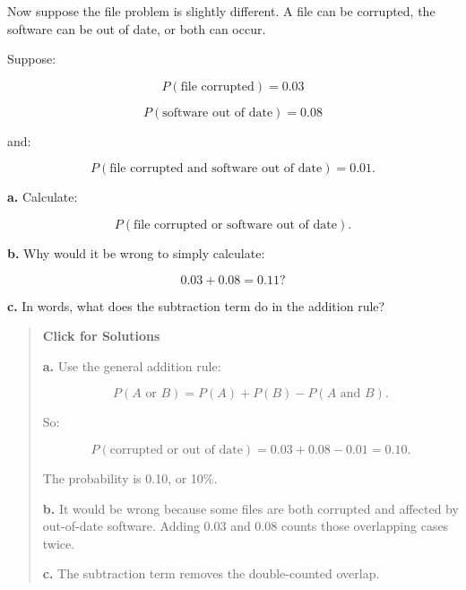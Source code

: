 \documentclass[
  letterpaper,
  DIV=11,
  numbers=noendperiod]{scrreprt}
\begin{document}
\begin{tcolorbox}[enhanced jigsaw, arc=.35mm, bottomrule=.15mm, bottomtitle=1mm, breakable, colback=white, colbacktitle=quarto-callout-note-color!10!white, colframe=quarto-callout-note-color-frame, coltitle=black, left=2mm, leftrule=.75mm, opacityback=0, opacitybacktitle=0.6, rightrule=.15mm, title=\textcolor{quarto-callout-note-color}{\faInfo}\hspace{0.5em}{Question 8}, titlerule=0mm, toprule=.15mm, toptitle=1mm]

Now suppose the file problem is slightly different. A file can be
corrupted, the software can be out of date, or both can occur.

Suppose:

\[P(\text{file corrupted}) = 0.03\]

\[P(\text{software out of date}) = 0.08\]

and:

\[P(\text{file corrupted and software out of date}) = 0.01.\]

\textbf{a.} Calculate:

\[P(\text{file corrupted or software out of date}).\]

\textbf{b.} Why would it be wrong to simply calculate:

\[0.03 + 0.08 = 0.11?\]

\textbf{c.} In words, what does the subtraction term do in the addition
rule?

\begin{quote}
\textbf{Click for Solutions}

\textbf{a.} Use the general addition rule:

\[P(A \text{ or } B) = P(A) + P(B) - P(A \text{ and } B).\]

So:

\[P(\text{corrupted or out of date}) = 0.03 + 0.08 - 0.01 = 0.10.\]

The probability is 0.10, or 10\%.

\textbf{b.} It would be wrong because some files are both corrupted and
affected by out-of-date software. Adding 0.03 and 0.08 counts those
overlapping cases twice.

\textbf{c.} The subtraction term removes the double-counted overlap.
\end{quote}

\end{tcolorbox}
\end{document}
